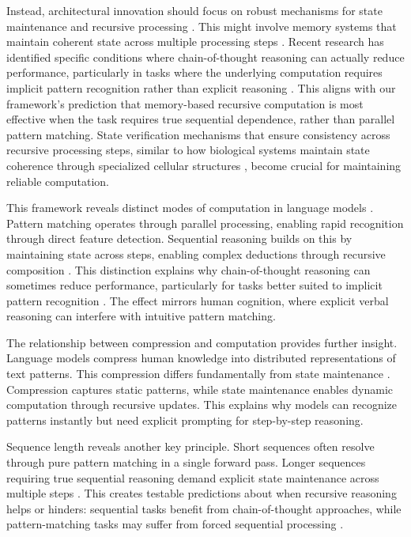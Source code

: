 \documentclass[12pt]{article}
\begin{document}
Instead, architectural innovation should focus on robust mechanisms for state maintenance and recursive processing \cite{jung2020new}.
This might involve memory systems that maintain coherent state across multiple processing steps \cite{zhu2024overcoming}.
Recent research has identified specific conditions where chain-of-thought reasoning can actually reduce performance, particularly in tasks where the underlying computation requires implicit pattern recognition rather than explicit reasoning \cite{liu2024mind}.
This aligns with our framework's prediction that memory-based recursive computation is most effective when the task requires true sequential dependence, rather than parallel pattern matching.
State verification mechanisms that ensure consistency across recursive processing steps, similar to how biological systems maintain state coherence through specialized cellular structures \cite{espinosa2024molecular}, become crucial for maintaining reliable computation.


This framework reveals distinct modes of computation in language models \cite{wei2022chain}.
Pattern matching operates through parallel processing, enabling rapid recognition through direct feature detection.
Sequential reasoning builds on this by maintaining state across steps, enabling complex deductions through recursive composition \cite{dickson2024trust}.
This distinction explains why chain-of-thought reasoning can sometimes reduce performance, particularly for tasks better suited to implicit pattern recognition \cite{liu2024mind}.
The effect mirrors human cognition, where explicit verbal reasoning can interfere with intuitive pattern matching.

The relationship between compression and computation provides further insight.
Language models compress human knowledge into distributed representations of text patterns.
This compression differs fundamentally from state maintenance \cite{dickson2024trust}.
Compression captures static patterns, while state maintenance enables dynamic computation through recursive updates.
This explains why models can recognize patterns instantly but need explicit prompting for step-by-step reasoning.

Sequence length reveals another key principle.
Short sequences often resolve through pure pattern matching in a single forward pass.
Longer sequences requiring true sequential reasoning demand explicit state maintenance across multiple steps \cite{wei2022chain}.
This creates testable predictions about when recursive reasoning helps or hinders: sequential tasks benefit from chain-of-thought approaches, while pattern-matching tasks may suffer from forced sequential processing \cite{liu2024mind}.
\end{document}
